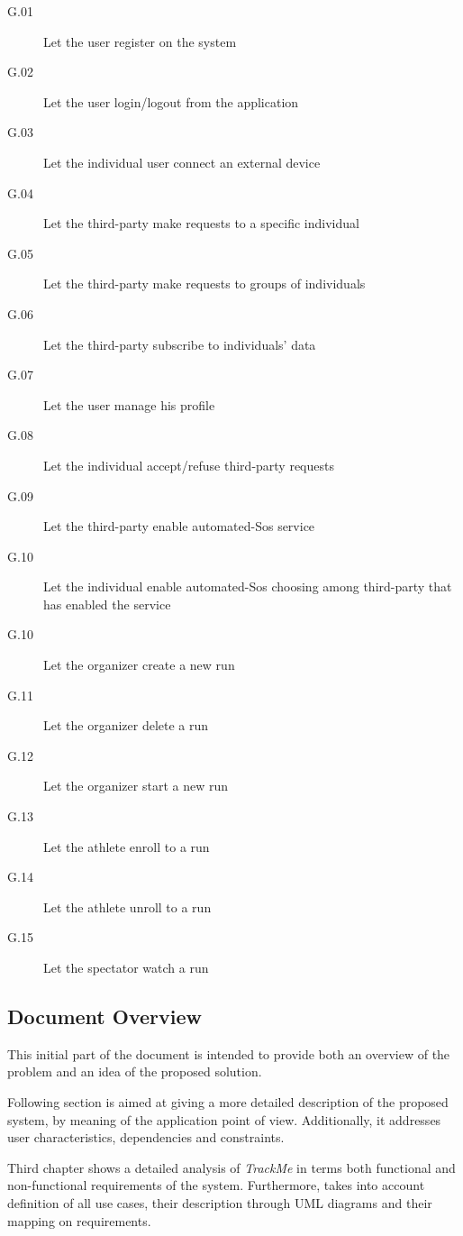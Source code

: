 \documentclass[a4paper]{article}
\begin{document}
        \begin{description}
            \item[G.01] Let the user register on the system
            \item[G.02] Let the user login/logout from the application
            \item[G.03] Let the individual user connect an external device
            \item[G.04] Let the third-party make requests to a specific individual
            \item[G.05] Let the third-party make requests to groups of individuals
            \item[G.06] Let the third-party subscribe to individuals' data
            \item[G.07] Let the user manage his profile
            \item[G.08] Let the individual accept/refuse third-party requests
            \item[G.09] Let the third-party enable automated-Sos service
            \item[G.10] Let the individual enable automated-Sos choosing among third-party that has enabled the service
            \item[G.10] Let the organizer create a new run
            \item[G.11] Let the organizer delete a run
            \item[G.12] Let the organizer start a new run
            \item[G.13] Let the athlete enroll to a run
            \item[G.14] Let the athlete unroll to a run
            \item[G.15] Let the spectator watch a run
        \end{description}
    
    \subsection{Document Overview}
        This initial part of the document is intended to provide both an overview of the problem and an idea of the proposed solution.
        
        Following section is aimed at giving a more detailed description of the proposed system, by meaning of the application point of view. Additionally, it addresses user characteristics, dependencies and constraints.
        
        Third chapter shows a detailed analysis of \textit{TrackMe} in terms both functional and non-functional requirements of the system. Furthermore, takes into account definition of all use cases, their description through UML diagrams and their mapping on requirements.
        
\end{document}
